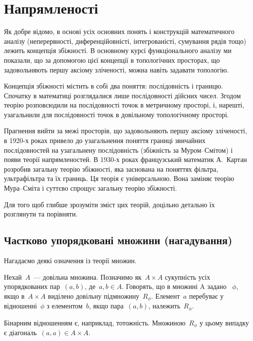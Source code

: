 \chapter{Напрямленості}

Як добре відомо, в основі усіх основних понять і конструкцій математичного аналізу (неперервності, диференційовністі, інтегрованісті, сумування рядів тощо) лежить концепція збіжності. В основному курсі функціонального аналізу ми показали, що за допомогою цієї концепції в топологічних просторах, що задовольняють першу аксіому зліченості, можна навіть задавати топологію. 

Концепція збіжності містить в собі два поняття: послідовність і границю. Спочатку в математиці розглядалися лише послідовності дійсних чисел. Згодом теорію розповсюдили на послідовності точок в метричному просторі, і, нарешті, узагальнили для послідовності точок в довільному топологічному просторі. 

Прагнення вийти за межі просторів, що задовольняють першу аксіому зліченості, в 1920-х роках привело до узагальнення поняття границі звичайних послідовностей на узагальнену послідовність (збіжність за Муром--Смітом) і появи теорії напрямленостей. В 1930-х роках французський математик А.~Картан розробив загальну теорію збіжності, яка заснована на поняттях фільтра, ультрафільтра та їх границь. Ця теорія є універсальною. Вона заміняє теорію Мура--Сміта і суттєво спрощує загальну теорію збіжності. 

Для того щоб глибше зрозуміти зміст цих теорій, доцільно детально їх розглянути та порівняти. 

\section{Частково упорядковані множини (нагадування)}

Нагадаємо деякі означення із теорії множин.

\begin{definition}
    Нехай~$A$~--- довільна множина. Позначимо як~$A \times A$ сукупність усіх упорядкованих пар~$(a, b)$, де~$a, b \in A$. Говорять, що в множині A задано ~$\phi$, якщо в~$A \times A$ виділено довільну підмножину~$R_\phi$. Елемент~$a$ перебуває у відношенні~$\phi$ з елементом~$b$, якщо пара~$(a, b)$, належить~$R_\phi$.
\end{definition}

\begin{example}
    Бінарним відношенням є, наприклад, тотожність. Множиною~$R_\phi$ у цьому випадку є діагональ~$(a, a) \in A \times A$.
\end{example}

